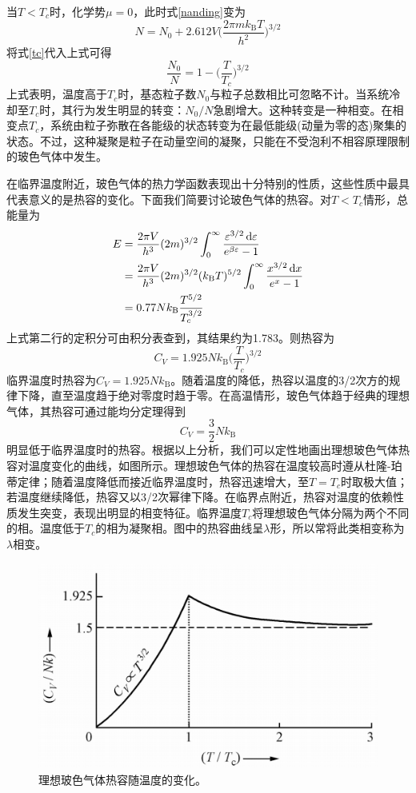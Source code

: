 \documentclass[UTF8,oneside,openany]{ctexbook}
\DeclareMathOperator\dif{d\!}
\newcommand\kb{k_{\text{B}}}
\begin{document}
当$T<T_c$时，化学势$\mu=0$，此时式\ref{nanding}变为
\begin{equation}
N=N_0+2.612V\biggl(\frac{2\pi m\kb T}{h^2}\biggr)^{3/2}
\end{equation}
将式\ref{tc}代入上式可得
\begin{equation}
\frac{N_0}{N}=1-\biggl(\frac{T}{T_c}\biggr)^{3/2}
\end{equation}
上式表明，温度高于$T_c$时，基态粒子数$N_0$与粒子总数相比可忽略不计。当系统冷却至$T_c$时，其行为发生明显的转变：$N_0/N$急剧增大。这种转变是一种相变。在相变点$T_c$，系统由粒子弥散在各能级的状态转变为在最低能级(动量为零的态)聚集的状态。不过，这种凝聚是粒子在动量空间的凝聚，只能在不受泡利不相容原理限制的玻色气体中发生。

在临界温度附近，玻色气体的热力学函数表现出十分特别的性质，这些性质中最具代表意义的是热容的变化。下面我们简要讨论玻色气体的热容。对$T<T_c$情形，总能量为
\begin{align}
E&=\frac{2\pi V}{h^3}(2m)^{3/2}\int_{0}^{\infty}\frac{\varepsilon^{3/2}\dif\varepsilon}{e^{\beta\varepsilon}-1}\notag\\
&=\frac{2\pi V}{h^3}(2m)^{3/2}(\kb T)^{5/2}\int_{0}^{\infty}\frac{x^{3/2}\dif x}{e^{x}-1}\notag\\
&=0.77N\kb\frac{T^{5/2}}{T_c^{3/2}}
\end{align}
上式第二行的定积分可由积分表查到，其结果约为1.783。则热容为
\begin{equation}
C_V=1.925N\kb\biggl(\frac{T}{T_c}\biggr)^{3/2}
\end{equation}
临界温度时热容为$C_V=1.925N\kb$。随着温度的降低，热容以温度的3/2次方的规律下降，直至温度趋于绝对零度时趋于零。在高温情形，玻色气体趋于经典的理想气体，其热容可通过能均分定理得到
\begin{equation}
C_V=\frac32N\kb
\end{equation}
明显低于临界温度时的热容。根据以上分析，我们可以定性地画出理想玻色气体热容对温度变化的曲线，如图所示。理想玻色气体的热容在温度较高时遵从杜隆-珀蒂定律；随着温度降低而接近临界温度时，热容迅速增大，至$T=T_c$时取极大值；若温度继续降低，热容又以3/2次幂律下降。在临界点附近，热容对温度的依赖性质发生突变，表现出明显的相变特征。临界温度$T_c$将理想玻色气体分隔为两个不同的相。温度低于$T_c$的相为凝聚相。图中的热容曲线呈$\lambda$形，所以常将此类相变称为$\lambda$相变。
\begin{figure}[ht]
	\centering
	\includegraphics[scale=0.5]{cv.png}
	\caption{理想玻色气体热容随温度的变化。}
\end{figure}
\end{document}
